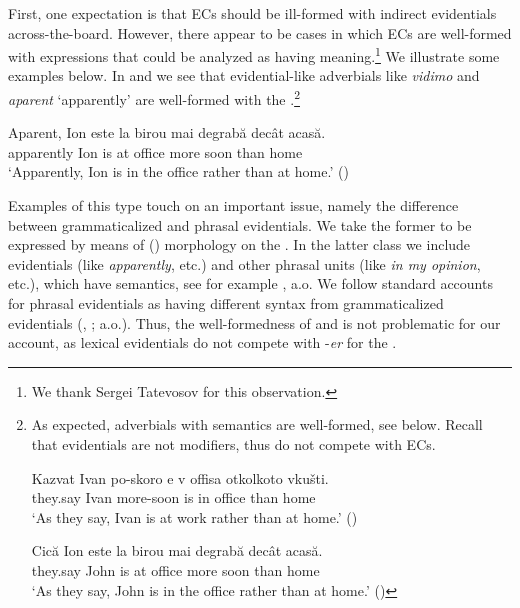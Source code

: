 \documentclass[output=paper,colorlinks,citecolor=brown,newtxmath]{langsci/langscibook}
\begin{document}
First, one expectation is that ECs should be ill-formed with indirect evidentials across-the-board. However, there appear to be cases in which ECs are well-formed with expressions that could be analyzed as having  meaning.\footnote{We thank Sergei Tatevosov for this observation.}
We illustrate some examples below. In  and  we see that evidential-like adverbials like \textit{vidimo} and \textit{aparent} `apparently' are well-formed with the .\footnote{As expected, adverbials with  semantics are well-formed, see below. Recall that  evidentials are not  modifiers, thus do not compete with ECs.

	\ea \gll Kazvat Ivan po-skoro e v offisa otkolkoto  vkušti. \\
	they.say Ivan	more-soon is 	in	office	than home \\
	\glt `As they say, Ivan is at work rather than at home.' \hfill ()
	\z

    \ea \gll Cică Ion este la birou mai degrabă decât acasă. \\
	they.say John is at office more soon than home\\
	\glt `As they say, John is in the office rather than at home.' \hfill ()
	\z

	}

	 \label{lexevidbul}
    \z

	\ea \gll Aparent, Ion este la birou mai degrabă decât acasă. \\
	apparently Ion is at office more soon than home\\
	\glt `Apparently, Ion is in the office rather than at home.' \hfill ()\label{lexevidrom}
    \z

\noindent Examples of this type touch on an important issue, namely the difference between grammaticalized and phrasal evidentials. We take the former to be expressed by means of () morphology on the . In the latter class we include  evidentials (like \textit{apparently}, etc.) and other phrasal units (like \textit{in my opinion}, etc.), which have  semantics, see for example \citealt{aikh14}, a.o. We follow standard accounts for phrasal evidentials as having different syntax from grammaticalized evidentials (\citealt{fall02}, \citealt{aikh14}; a.o.). Thus, the well-formedness of  and  is not problematic for our account, as lexical evidentials do not compete with -\textit{er} for the  .
\end{document}
